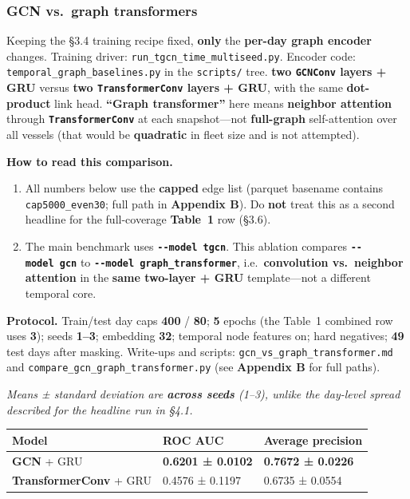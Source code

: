 \documentclass[
]{article}
\newcounter{none} %
\providecommand{\tightlist}{%
  \setlength{\itemsep}{0pt}\setlength{\parskip}{0pt}}
\begin{document}
\subsubsection{GCN vs.~graph
transformers}\label{gcn-vs.-graph-transformers}

Keeping the §3.4 training recipe fixed, \textbf{only} the
\textbf{per-day graph encoder} changes. Training driver:
\texttt{run\_tgcn\_time\_multiseed.py}. Encoder code:
\texttt{temporal\_graph\_baselines.py} in the \texttt{scripts/} tree.
\textbf{two \texttt{GCNConv} layers + GRU} versus \textbf{two
\texttt{TransformerConv} layers + GRU}, with the same
\textbf{dot-product} link head. \textbf{``Graph transformer''} here
means \textbf{neighbor attention} through
\textbf{\texttt{TransformerConv}} at each snapshot---not
\textbf{full-graph} self-attention over all vessels (that would be
\textbf{quadratic} in fleet size and is not attempted).

\textbf{How to read this comparison.}

\begin{enumerate}
\def\labelenumi{\arabic{enumi}.}
\tightlist
\item
  All numbers below use the \textbf{capped} edge list (parquet basename
  contains \texttt{cap5000\_even30}; full path in \textbf{Appendix B}).
  Do \textbf{not} treat this as a second headline for the full-coverage
  \textbf{Table~1} row (§3.6).\\
\item
  The main benchmark uses \textbf{\texttt{-\/-model\ tgcn}}. This
  ablation compares \textbf{\texttt{-\/-model\ gcn}} to
  \textbf{\texttt{-\/-model\ graph\_transformer}},
  i.e.~\textbf{convolution vs.~neighbor attention} in the \textbf{same
  two-layer + GRU} template---not a different temporal core.
\end{enumerate}

\textbf{Protocol.} Train/test day caps \textbf{400} / \textbf{80};
\textbf{5} epochs (the Table~1 combined row uses \textbf{3}); seeds
\textbf{1--3}; embedding \textbf{32}; temporal node features on; hard
negatives; \textbf{49} test days after masking. Write-ups and scripts:
\texttt{gcn\_vs\_graph\_transformer.md} and
\texttt{compare\_gcn\_graph\_transformer.py} (see \textbf{Appendix B}
for full paths).

\emph{Means ± standard deviation are \textbf{across seeds} (1--3),
unlike the day-level spread described for the headline run in §4.1.}

{\def\LTcaptype{none} %
\begin{longtable}[]{@{}lll@{}}
\toprule\noalign{}
Model & ROC AUC & Average precision \\
\midrule\noalign{}
\endhead
\bottomrule\noalign{}
\endlastfoot
\textbf{GCN} + GRU & \textbf{0.6201 ± 0.0102} & \textbf{0.7672 ±
0.0226} \\
\textbf{TransformerConv} + GRU & 0.4576 ± 0.1197 & 0.6735 ± 0.0554 \\
\end{longtable}
}
\end{document}
